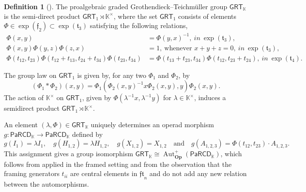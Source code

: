 \documentclass{amsart}
\newcommand{\kk}{\mathbb{K}}    %
\newcommand{\PaRCD}{\mathsf{PaRCD}}
\newcommand{\hPaRCD}{{\PaRCD}_{\kk}}
\newcommand{\Op}{\mathbf{Op}}
\newcommand{\Aut}{\operatorname{Aut}}
\newcommand{\GRT}{{\mathsf{GRT}}}
\newcommand{\ft}{\mathfrak{t}}
\newcommand{\ff}{\mathfrak{f}}
\theoremstyle{definition}
\newtheorem{definition}[theorem]{Definition}%
\numberwithin{equation}{section}
\begin{document}
\begin{definition}[\cite{Drin}]\label{Def:GRT}
The proalgebraic graded Grothendieck--Teichmüller group $\GRT_{\kk}$ is the semi-direct product $\GRT_1 \rtimes \kk^{\times}$, where the set $\GRT_1$ consists of elements $\Phi \in \exp({\ff_2}) \subset \exp({\ft_3})$ satisfying the following relations,
\begin{align}
    \Phi(x, y) &= \Phi(y, x)^{-1}, \ in \ \exp({\ft_3}) \tag{I}\label{GRT:I}, \\
    \Phi(x, y)\Phi(y, z)\Phi(z, x) &= 1, \ \text{whenever } x + y + z = 0, \ in \ \exp({\ft_3})  \tag{H} \label{GRT:H},\\
   \Phi(t_{12}, t_{23}) \Phi(t_{12}+t_{13}, t_{24}+t_{34})\Phi(t_{23}, t_{34}) &= \Phi(t_{13}+t_{23}, t_{34}) \Phi(t_{12}, t_{23}+t_{24}), \ in \ \exp({\ft_4})\tag{P}\label{GRT:P}.
\end{align}
\end{definition}

The group law on $\GRT_1$ is given by, for any two $\Phi_1$ and $\Phi_2$, by 
\begin{equation}
    ( \Phi_1 \ast \Phi_2)(x,y) = \Phi_1(\Phi_2(x,y)^{-1}x\Phi_2(x,y),y) \Phi_2(x,y).
\end{equation} The action of $\kk^{\times}$ on $\GRT_1$, given by $\Phi(\lambda^{-1}x,\lambda^{-1}y)$ for $\lambda \in \kk^{\times}$, induces a semidirect product $\GRT_1 \rtimes \kk^{\times}$.


An element $(\lambda, \Phi) \in \GRT_{\kk}$ uniquely determines an operad morphism $g:\PaRCD_{\kk} \rightarrow \hPaRCD$ defined by
\begin{equation}\label{eq: assignment of PaRCD to PaRCD}
    g(I_{1})= \lambda I_{1}, \quad g(H_{1,2}) = \lambda H_{1,2}, \quad g(X_{1,2}) = X_{1,2} \quad \text{and} \quad g(A_{1,2,3}) = \Phi(t_{12}, t_{23})\cdot A_{1,2,3}.
\end{equation}
This assignment gives a group isomorphism $\GRT_{\kk} \cong \Aut^{+}_{\Op}(\hPaRCD)$, which follows from \cite[Theorem 10.3.10]{FresseBook1} applied in the framed setting and from the observation that the framing generators $t_{ii}$ are central elements in $\mathfrak{ft}_{n}$ and do not add any new relation between the automorphisms.
\end{document}
